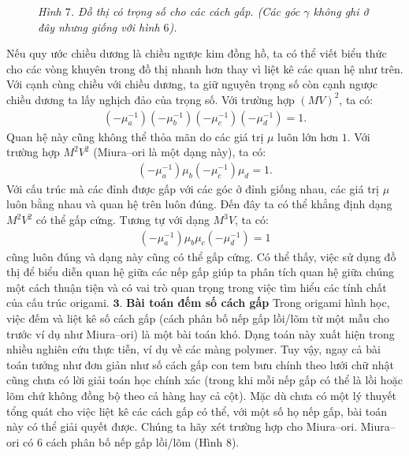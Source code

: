 \begin{multicols}{2}
\begin{figure}[H]
		\caption{\small\textit{\color{duongvaotoanhoc}	Hình $7$. Đồ thị có trọng số cho các cách gấp. (Các góc $\gamma$ không ghi ở đây nhưng giống với hình $6$).}}
		\vspace*{-10pt}
	\end{figure}
	Nếu quy ước chiều dương là chiều ngược kim đồng hồ, ta có thể viết biểu thức cho các vòng khuyên trong đồ thị nhanh hơn thay vì liệt kê các quan hệ như trên. Với cạnh cùng chiều với chiều dương, ta giữ nguyên trọng số còn cạnh ngược chiều dương ta lấy nghịch đảo của trọng số. Với trường hợp $(MV)^2$, ta có:
	\begin{align*}
		\left(-\mu_a^{-1}\right)\left(-\mu_b^{-1}\right)\left(-\mu_c^{-1}\right)\left(-\mu_d^{-1}\right) = 1.
	\end{align*}
	Quan hệ này cũng không thể thỏa mãn do các giá trị $\mu$ luôn lớn hơn $1$.
	\vskip 0.05cm
	Với trường hợp $M^2 V^2$ (Miura--ori là một dạng này), ta có:
	\begin{align*}
		\left(-\mu_a^{-1}\right)\mu_b\left(-\mu_c^{-1}\right)\mu_d = 1.
	\end{align*}
	Với cấu trúc mà các đỉnh được gấp với các góc ở đỉnh giống nhau, các giá trị $\mu$ luôn bằng nhau và quan hệ trên luôn đúng. Đến đây ta có thể khẳng định dạng $M^2 V^2$ có thể gấp cứng.
	\vskip 0.05cm
	Tương tự với dạng $M^3 V$, ta có:
	\begin{align*}
		\left(-\mu_a^{-1}\right)\mu_b\mu_c \left(-\mu_d^{-1}\right)=1
	\end{align*}
	cũng luôn đúng và dạng này cũng có thể gấp cứng.
	\vskip 0.05cm
	Có thể thấy, việc sử dụng đồ thị để biểu diễn quan hệ giữa các nếp gấp giúp ta phân tích quan hệ giữa chúng một cách thuận tiện và có vai trò quan trọng trong việc tìm hiểu các  tính chất của cấu trúc origami.
	\vskip 0.05cm
	$\pmb{3.}$ \textbf{\color{toanhocdoisong}Bài toán đếm số cách gấp}
	\vskip 0.05cm
	Trong origami hình học, việc đếm và liệt kê số cách gấp (cách phân bố nếp gấp lồi/lõm từ một mẫu cho trước ví dụ như Miura--ori) là một bài toán khó. Dạng toán này xuất hiện trong nhiều nghiên cứu thực tiễn, ví dụ về các màng polymer. Tuy vậy, ngay cả bài toán tưởng như đơn giản như số cách gấp con tem bưu chính theo lưới chữ nhật cũng chưa có lời giải toán học chính xác (trong khi mỗi nếp gấp có thể là lồi hoặc lõm chứ không đồng bộ theo cả hàng hay cả cột).
	\vskip 0.05cm
	Mặc dù chưa có một lý thuyết tổng quát cho việc liệt kê các cách gấp có thể, với một số họ nếp gấp, bài toán này có thể giải quyết được. Chúng ta hãy xét trường hợp cho Miura--ori. Miura--ori có $6$ cách phân bố nếp gấp lồi/lõm (Hình $8$). 

\end{multicols}
